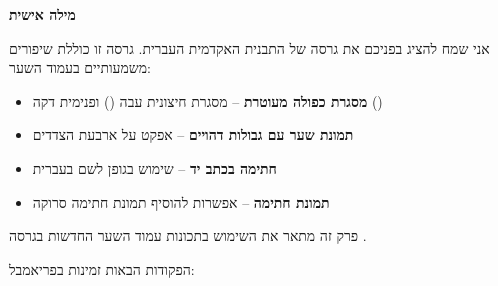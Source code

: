 \documentclass[book]{hebrew-academic-template}
\date{\textenglish{January 2026}}
\begin{document}
\frontmatter

\maketitle

\newpage
\thispagestyle{empty}

{\LARGE\bfseries מילה אישית}

\bigskip

אני שמח להציג בפניכם את גרסה  של התבנית האקדמית העברית. גרסה זו כוללת שיפורים משמעותיים בעמוד השער:

\begin{itemize}
    \item \textbf{מסגרת כפולה מעוטרת} -- מסגרת חיצונית עבה (\en{3pt}) ופנימית דקה (\en{1pt})
    \item \textbf{תמונת שער עם גבולות דהויים} -- אפקט  על ארבעת הצדדים
    \item \textbf{חתימה בכתב יד} -- שימוש בגופן  לשם בעברית
    \item \textbf{תמונת חתימה} -- אפשרות להוסיף תמונת חתימה סרוקה
\end{itemize}

\vspace{1cm}

\makesignature

\tableofcontents

\mainmatter


פרק זה מתאר את השימוש בתכונות עמוד השער החדשות בגרסה .


הפקודות הבאות זמינות בפריאמבל:
\end{document}
